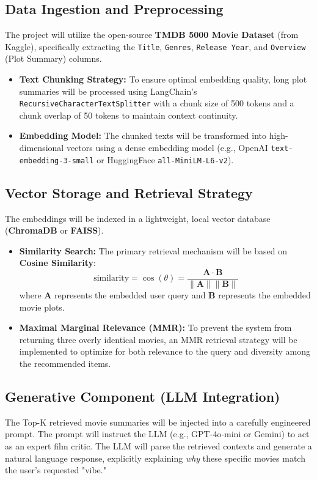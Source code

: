 \documentclass[12pt, a4paper]{article}
\begin{document}
\subsection{Data Ingestion and Preprocessing}
The project will utilize the open-source \textbf{TMDB 5000 Movie Dataset} (from Kaggle), specifically extracting the \texttt{Title}, \texttt{Genres}, \texttt{Release Year}, and \texttt{Overview} (Plot Summary) columns. 
\begin{itemize}
    \item \textbf{Text Chunking Strategy:} To ensure optimal embedding quality, long plot summaries will be processed using LangChain's \texttt{RecursiveCharacterTextSplitter} with a chunk size of 500 tokens and a chunk overlap of 50 tokens to maintain context continuity.
    \item \textbf{Embedding Model:} The chunked texts will be transformed into high-dimensional vectors using a dense embedding model (e.g., OpenAI \texttt{text-embedding-3-small} or HuggingFace \texttt{all-MiniLM-L6-v2}).
\end{itemize}

\subsection{Vector Storage and Retrieval Strategy}
The embeddings will be indexed in a lightweight, local vector database (\textbf{ChromaDB} or \textbf{FAISS}). 
\begin{itemize}
    \item \textbf{Similarity Search:} The primary retrieval mechanism will be based on \textbf{Cosine Similarity}:
    \begin{equation}
        \text{similarity} = \cos(\theta) = \frac{\mathbf{A} \cdot \mathbf{B}}{\|\mathbf{A}\| \|\mathbf{B}\|}
    \end{equation}
    where $\mathbf{A}$ represents the embedded user query and $\mathbf{B}$ represents the embedded movie plots.
    \item \textbf{Maximal Marginal Relevance (MMR):} To prevent the system from returning three overly identical movies, an MMR retrieval strategy will be implemented to optimize for both relevance to the query and diversity among the recommended items.
\end{itemize}

\subsection{Generative Component (LLM Integration)}
The Top-K retrieved movie summaries will be injected into a carefully engineered prompt. The prompt will instruct the LLM (e.g., GPT-4o-mini or Gemini) to act as an expert film critic. The LLM will parse the retrieved contexts and generate a natural language response, explicitly explaining \textit{why} these specific movies match the user's requested "vibe."
\end{document}
